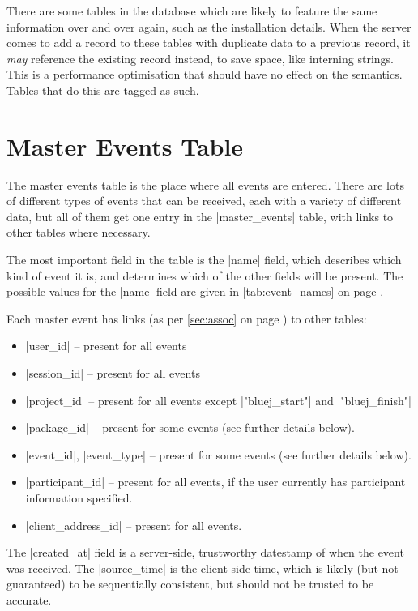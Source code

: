 \documentclass{report}
\newcommand{\myref}[1]{\autoref{#1} on page \pageref*{#1}}
\begin{document}
There are some tables in the database which are likely to feature the same
information over and over again, such as the installation details.  When the
server comes to add a record to these tables with duplicate data to a previous
record, it \textit{may} reference the existing record instead, to save space, like
interning strings.  This is a performance optimisation that should have no
effect on the semantics.  Tables that do this are tagged as such.

\chapter{Master Events Table}

The master events table is the place where all events are entered.  There are
lots of different types of events that can be received, each with a variety of
different data, but all of them get one entry in the |master_events|
table, with links to other tables where necessary.


The most important field in the table is the |name| field, which describes
which kind of event it is, and determines which of the other fields will be
present.  The possible values for the |name| field are given in \myref{tab:event_names}.

Each master event has links (as per \myref{sec:assoc}) to other tables:
\begin{itemize}
\item |user_id| -- present for all events
\item |session_id| -- present for all events
\item |project_id| -- present for all events except |"bluej_start"| and |"bluej_finish"|
\item |package_id| -- present for some events (see further details below).
\item |event_id|, |event_type| -- present for some events (see further details below).
\item |participant_id| -- present for all events, if the user currently has
  participant information specified.
\item |client_address_id| -- present for all events.
\end{itemize}

The |created_at| field is a server-side, trustworthy datestamp of when
the event was received.  The |source_time| is the client-side time,
which is likely (but not guaranteed) to be sequentially consistent, but should
not be trusted to be accurate.
\end{document}
